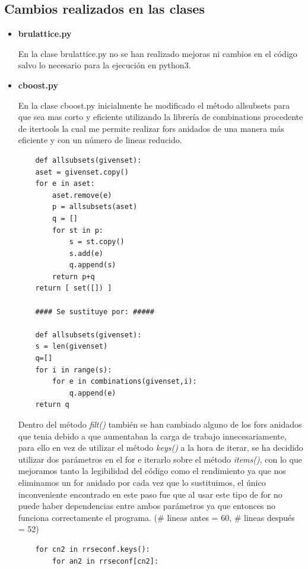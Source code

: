 \documentclass{cosas/tfg_domingo}
\begin{document}
\subsection{Cambios realizados en las clases}

\begin{itemize}

\item \textbf{brulattice.py}

En la clase brulattice.py no se han realizado mejoras ni cambios en el código salvo lo necesario para la ejecución en python3.

\item \textbf{cboost.py}

En la clase cboost.py inicialmente he modificado el método allsubsets para que sea mas corto y eficiente utilizando la librería de combinations procedente de itertools la cual me permite realizar fors anidados de una manera más eficiente y con un número de lineas reducido.
\begin{verbatim}
    def allsubsets(givenset):
    aset = givenset.copy()
    for e in aset:
        aset.remove(e)
        p = allsubsets(aset)
        q = []
        for st in p:
            s = st.copy()
            s.add(e)
            q.append(s)
        return p+q
    return [ set([]) ]
    
    #### Se sustituye por: #####
    
    def allsubsets(givenset):
    s = len(givenset)
    q=[]
    for i in range(s):
        for e in combinations(givenset,i):
            q.append(e)
    return q
\end{verbatim}

Dentro del método \textit{filt()} también se han cambiado alguno de los fors anidados que tenia debido a que aumentaban la carga de trabajo innecesariamente, para ello en vez de utilizar el método \textit{keys()} a la hora de iterar, se ha decidido utilizar dos parámetros en el for e iterarlo sobre el método \textit{items()}, con lo que mejoramos tanto la legibilidad del código como el rendimiento ya que nos eliminamos un for anidado por cada vez que lo sustituimos, el único inconveniente encontrado en este paso fue que al usar este tipo de for no puede haber dependencias entre ambos parámetros ya que entonces no funciona correctamente el programa. (\# lineas antes = 60, \# lineas después = 52)

\begin{verbatim}
    for cn2 in rrseconf.keys():
        for an2 in rrseconf[cn2]:
        

\end{verbatim}
\end{itemize}
\end{document}
